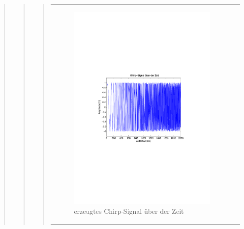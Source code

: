 \begin{quote}
\begin{quote}
\begin{quote}
\begin{center}
\begin{tabular}{ll}
\begin{minipage}{0.6\textwidth}
                        \begin{figure}[H]
                            \label{fig:}
                            \includegraphics[scale=0.63, trim = 3cm 9cm 3cm
                            9cm, clip]{./Bilder/Termin7/bsp_chirp}
                            \caption{erzeugtes Chirp-Signal über der Zeit}
                        \end{figure}
    
                    \end{minipage}
                    \begin{minipage}{0.6\textwidth}
    

\end{minipage}
\end{tabular}
\end{center}
\end{quote}
\end{quote}
\end{quote}
